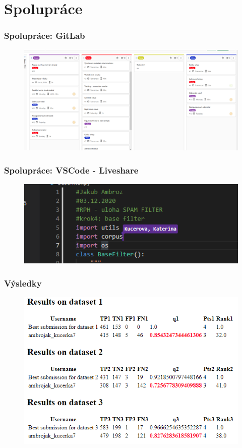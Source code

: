 \documentclass{beamer}
\begin{document}
\section{Spolupráce}
\begin{frame}
\frametitle{Spolupráce: GitLab}
\begin{figure}
	\centering
	\includegraphics[width=1\textwidth]{TODO_LIST.png}
\end{figure}
\end{frame}

\begin{frame}
    \frametitle{Spolupráce: VSCode - Liveshare}
\begin{figure}
	\centering
	\includegraphics[width=1\textwidth]{liveshare2.png}
\end{figure}
\end{frame}
\begin{frame}
	\frametitle{Výsledky}
	\begin{figure}
		\centering
		\includegraphics[width=1\textwidth]{results.png}
	\end{figure}
\end{frame}
\end{document}
